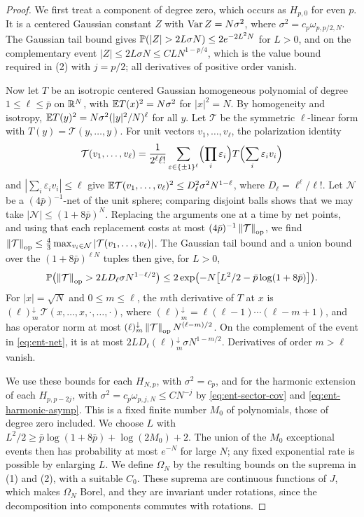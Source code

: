 \begin{proof}
We first treat a component of degree zero, which occurs as $H_{p,0}$ for
even $p$. It is a centered Gaussian constant $Z$ with $\operatorname{Var} Z=N\sigma^2$,
where $\sigma^2=c_p\omega_{p,p/2,N}$. The Gaussian tail bound gives
$\Pp(|Z|>2L\sigma N)\le2e^{-2L^2N}$ for $L>0$, and on the complementary
event $|Z|\le2L\sigma N\le CLN^{1-p/4}$, which is the value bound required
in (2) with $j=p/2$; all derivatives of positive order vanish.

Now let $T$ be an isotropic centered Gaussian homogeneous polynomial of
degree $1\le\ell\le\bar p$ on $\mathbb R^N$, with $\mathbb E T(x)^2=N\sigma^2$ for $|x|^2=N$. By
homogeneity and isotropy, $\mathbb E T(y)^2=N\sigma^2(|y|^2/N)^\ell$ for all $y$.
Let $\mathcal T$ be the symmetric $\ell$-linear form with
$T(y)=\mathcal T(y,\dots,y)$. For unit vectors $v_1,\dots,v_\ell$, the
polarization identity
\[
 \mathcal T(v_1,\dots,v_\ell)=\frac1{2^\ell\ell!}
 \sum_{\varepsilon\in\{\pm1\}^\ell}\Bigl(\prod_i\varepsilon_i\Bigr)
 T\Bigl(\sum_i\varepsilon_iv_i\Bigr)
\]
and $|\sum_i\varepsilon_iv_i|\le\ell$ give
$\mathbb E\mathcal T(v_1,\dots,v_\ell)^2\le D_\ell^2\sigma^2N^{1-\ell}$, where
$D_\ell=\ell^\ell/\ell!$. Let $\mathcal N$ be a $(4\bar p)^{-1}$-net of the
unit sphere; comparing disjoint balls shows that we may take
$|\mathcal N|\le(1+8\bar p)^N$. Replacing the arguments one at a time by net
points, and using that each replacement costs at most
$(4\bar p)^{-1}\left\lVert\mathcal T\right\rVert_{\rm op}$, we find
$\left\lVert\mathcal T\right\rVert_{\rm op}\le\frac43\max_{v_i\in\mathcal N}
|\mathcal T(v_1,\dots,v_\ell)|$. The Gaussian tail bound and a union bound
over the $(1+8\bar p)^{\ell N}$ tuples then give, for $L>0$,
\begin{equation}\label{eq:ent-net}
 \mathbb P\bigl(\left\lVert\mathcal T\right\rVert_{\rm op}>2LD_\ell\sigma N^{1-\ell/2}\bigr)
 \le2\exp\bigl(-N\bigl[L^2/2-\bar p\log(1+8\bar p)\bigr]\bigr).
\end{equation}
For $|x|=\sqrt N$ and $0\le m\le\ell$, the $m$th derivative of $T$ at $x$
is $(\ell)_m^{\downarrow}\,\mathcal T(x,\dots,x,\cdot,\dots,\cdot)$, where
$(\ell)_m^{\downarrow}=\ell(\ell-1)\cdots(\ell-m+1)$, and has operator norm
at most $(\ell)_m^{\downarrow}\left\lVert\mathcal T\right\rVert_{\rm op}N^{(\ell-m)/2}$. On
the complement of the event in \eqref{eq:ent-net}, it is at most
$2LD_\ell(\ell)_m^{\downarrow}\sigma N^{1-m/2}$. Derivatives of order
$m>\ell$ vanish.

We use these bounds for each $H_{N,p}$, with $\sigma^2=c_p$, and for the
harmonic extension of each $H_{p,p-2j}$, with $\sigma^2=c_p\omega_{p,j,N}\le CN^{-j}$
by \eqref{eq:ent-sector-cov} and \eqref{eq:ent-harmonic-asymp}. This is a
fixed finite number $M_0$ of polynomials, those of degree zero included.
We choose $L$ with
$L^2/2\ge\bar p\log(1+8\bar p)+\log(2M_0)+2$. The union of the $M_0$
exceptional events then has probability at most $e^{-N}$ for large $N$; any
fixed exponential rate is possible by enlarging $L$. We define $\Omega_N$ by
the resulting bounds on the suprema in (1) and (2), with a suitable $C_0$.
These suprema are continuous functions of $J$, which makes $\Omega_N$
Borel, and they are invariant under rotations, since the decomposition into components
commutes with rotations.


\end{proof}
